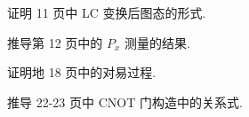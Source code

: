 \documentclass{assignment}
\begin{document}
\begin{prob}
    证明 11 页中 LC 变换后图态的形式.
\end{prob}
\begin{sol}
    
\end{sol}

\begin{prob}
    推导第 12 页中的 $P_x$ 测量的结果.
\end{prob}
\begin{sol}
    
\end{sol}

\begin{prob}
    证明地 18 页中的对易过程.
\end{prob}
\begin{sol}
    
\end{sol}

\begin{prob}
    推导 22-23 页中 CNOT 门构造中的关系式.
\end{prob}
\begin{sol}
    
\end{sol}
\end{document}

